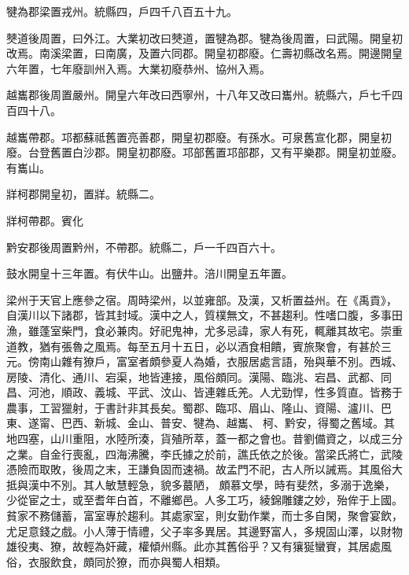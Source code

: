 \begin{pinyinscope}
 犍為郡梁置戎州。統縣四，戶四千八百五十九。



 僰道後周置，曰外江。大業初改曰僰道，置犍為郡。犍為後周置，曰武陽。開皇初改焉。南溪梁置，曰南廣，及置六同郡。開皇初郡廢。仁壽初縣改名焉。開邊開皇六年置，七年廢訓州入焉。大業初廢恭州、協州入焉。



 越巂郡後周置嚴州。開皇六年改曰西寧州，十八年又改曰巂州。統縣六，戶七千四百四十八。



 越巂帶郡。邛都蘇祗舊置亮善郡，開皇初郡廢。有孫水。可泉舊宣化郡，開皇初廢。台登舊置白沙郡。開皇初郡廢。邛部舊置邛部郡，又有平樂郡。開皇初並廢。有巂山。



 牂柯郡開皇初，置牂。統縣二。



 牂柯帶郡。賓化



 黔安郡後周置黔州，不帶郡。統縣二，戶一千四百六十。



 鼓水開皇十三年置。有伏牛山。出鹽井。涪川開皇五年置。



 梁州于天官上應參之宿。周時梁州，以並雍部。及漢，又析置益州。在《禹貢》，自漢川以下諸郡，皆其封域。漢中之人，質樸無文，不甚趨利。性嗜口腹，多事田漁，雖蓬室柴門，食必兼肉。好祀鬼神，尤多忌諱，家人有死，輒離其故宅。崇重道教，猶有張魯之風焉。每至五月十五日，必以酒食相饋，賓旅聚會，有甚於三元。傍南山雜有獠戶，富室者頗參夏人為婚，衣服居處言語，殆與華不別。西城、
 房陵、清化、通川、宕渠，地皆連接，風俗頗同。漢陽、臨洮、宕昌、武都、同昌、河池，順政、義城、平武、汶山、皆連雜氐羌。人尤勁悍，性多質直。皆務于農事，工習獵射，于書計非其長矣。蜀郡、臨邛、眉山、隆山、資陽、瀘川、巴東、遂甯、巴西、新城、金山、普安、犍為、越巂、柯、黔安，得蜀之舊域。其地四塞，山川重阻，水陸所湊，貨殖所萃，蓋一都之會也。昔劉備資之，以成三分之業。自金行喪亂，四海沸騰，李氏據之於前，譙氏依之於後。當梁氏將亡，武陵憑險而取敗，後周之末，王謙負固而速禍。故孟門不祀，古人所以誡焉。其風俗大抵與漢中不別。其人敏慧輕急，貌多蕞陋，
 頗慕文學，時有斐然，多溺于逸樂，少從宦之士，或至耆年白首，不離鄉邑。人多工巧，綾錦雕鏤之妙，殆侔于上國。貧家不務儲蓄，富室專於趨利。其處家室，則女勤作業，而士多自閑，聚會宴飲，尤足意錢之戲。小人薄于情禮，父子率多異居。其邊野富人，多規固山澤，以財物雄役夷、獠，故輕為奸藏，權傾州縣。此亦其舊俗乎？又有獽狿蠻賨，其居處風俗，衣服飲食，頗同於獠，而亦與蜀人相類。



\end{pinyinscope}